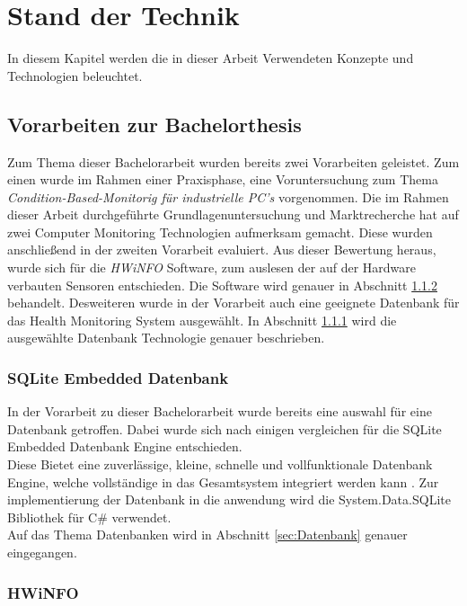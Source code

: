 \chapter{Stand der Technik}
In diesem Kapitel werden die in dieser Arbeit Verwendeten Konzepte und Technologien beleuchtet. 

\section{Vorarbeiten zur Bachelorthesis}
Zum Thema dieser Bachelorarbeit wurden bereits zwei Vorarbeiten geleistet. Zum einen wurde im Rahmen einer Praxisphase, eine Voruntersuchung zum Thema \textit{Condition-Based-Monitorig für industrielle PC's}  vorgenommen. Die im Rahmen dieser Arbeit \cite{PAMathias} durchgeführte Grundlagenuntersuchung und Marktrecherche hat auf zwei Computer Monitoring Technologien aufmerksam gemacht. Diese wurden anschließend in der zweiten Vorarbeit \cite{t3000} evaluiert. Aus dieser Bewertung heraus, wurde sich für die \textit{HWiNFO} Software, zum auslesen der auf der Hardware verbauten Sensoren entschieden. Die Software wird genauer in Abschnitt \ref{sec:HWiNFO} behandelt. Desweiteren wurde in der Vorarbeit \cite{t3000} auch eine geeignete Datenbank für das Health Monitoring System ausgewählt. In Abschnitt \ref{sec:SQLite} wird die ausgewählte Datenbank Technologie genauer beschrieben.   

\subsection{SQLite Embedded Datenbank}\label{sec:SQLite}
In der Vorarbeit zu dieser Bachelorarbeit wurde bereits eine auswahl für eine Datenbank getroffen. Dabei wurde sich nach einigen vergleichen für die SQLite Embedded Datenbank Engine entschieden. \\
Diese Bietet eine zuverlässige, kleine, schnelle und vollfunktionale Datenbank Engine, welche vollständige in das Gesamtsystem integriert werden kann \cite{SQLiteHompage}. Zur implementierung der Datenbank in die anwendung wird die System.Data.SQLite Bibliothek für C\# verwendet.\\
Auf das Thema Datenbanken wird in Abschnitt \ref{sec:Datenbank} genauer eingegangen.

\subsection{HWiNFO}\label{sec:HWiNFO}
